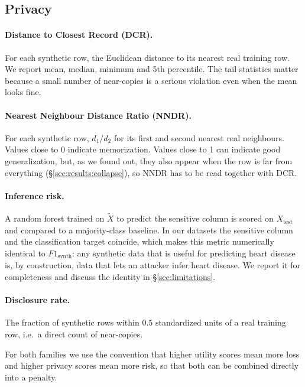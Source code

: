 \documentclass[11pt,a4paper]{article}
\begin{document}
\subsection{Privacy}

\paragraph{Distance to Closest Record (DCR).}
For each synthetic row, the Euclidean distance to its nearest real training
row. We report mean, median, minimum and 5th percentile. The tail statistics
matter because a small number of near-copies is a serious violation even when
the mean looks fine.

\paragraph{Nearest Neighbour Distance Ratio (NNDR).}
For each synthetic row, $d_1 / d_2$ for its first and second nearest real
neighbours. Values close to 0 indicate memorization. Values close to 1 can
indicate good generalization, but, as we found out, they also appear when the
row is far from everything (\S\ref{sec:results:collapse}), so NNDR has to be
read together with DCR.

\paragraph{Inference risk.}
A random forest trained on $\tilde{X}$ to predict the sensitive column is
scored on $X_{\text{test}}$ and compared to a majority-class baseline. In our
datasets the sensitive column and the classification target coincide, which
makes this metric numerically identical to $F1_{\text{synth}}$: any synthetic
data that is useful for predicting heart disease is, by construction, data
that lets an attacker infer heart disease. We report it for completeness and
discuss the identity in \S\ref{sec:limitations}.

\paragraph{Disclosure rate.}
The fraction of synthetic rows within $0.5$ standardized units of a real
training row, i.e.\ a direct count of near-copies.

For both families we use the convention that higher utility scores mean more
loss and higher privacy scores mean more risk, so that both can be combined
directly into a penalty.
\end{document}
